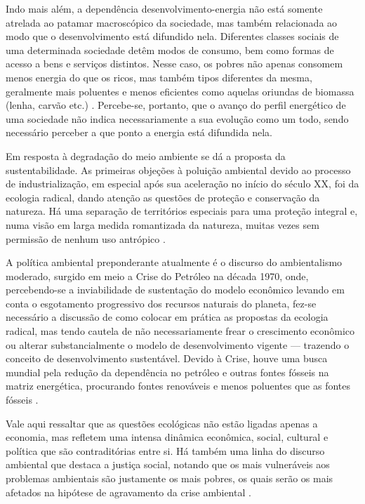 Indo mais além, a dependência desenvolvimento-energia não está somente atrelada
ao patamar macroscópico da sociedade, mas também relacionada ao modo que o
desenvolvimento está difundido nela. Diferentes classes sociais de uma
determinada sociedade detêm modos de consumo, bem como formas de acesso a bens e
serviços distintos. Nesse caso, os pobres não apenas consomem menos
energia do que os ricos, mas também tipos diferentes da mesma, geralmente mais
poluentes e menos eficientes como aquelas oriundas de biomassa (lenha, carvão
etc.) \cite{rippel}. Percebe-se, portanto, que o avanço do perfil energético de
uma sociedade não indica necessariamente a sua evolução como um todo, sendo
necessário perceber a que ponto a energia está difundida nela.

Em resposta à degradação do meio ambiente se dá a proposta da
sustentabilidade. As primeiras objeções à poluição ambiental devido ao processo 
de industrialização, em especial após sua aceleração no início do século XX,
foi da ecologia radical, dando atenção as questões de proteção e conservação da natureza.
Há uma separação de territórios especiais para uma proteção integral e, numa
visão em larga medida romantizada da natureza, muitas vezes sem permissão 
de nenhum uso antrópico \cite{jatoba}.

A política ambiental preponderante atualmente é o discurso do ambientalismo moderado, 
surgido em meio a Crise do Petróleo na década 1970, onde, percebendo-se a
inviabilidade de sustentação do modelo econômico levando em conta o esgotamento
progressivo dos recursos naturais do planeta, fez-se necessário a discussão de como 
colocar em prática as propostas da ecologia radical, mas tendo cautela de não 
necessariamente frear o crescimento econômico ou alterar substancialmente o 
modelo de desenvolvimento vigente --- trazendo o conceito de desenvolvimento
sustentável. Devido à Crise, houve uma busca mundial pela redução da 
dependência no petróleo e outras fontes fósseis na matriz energética, 
procurando fontes renováveis e menos poluentes que as fontes fósseis 
\cite{jatoba,epe_eficiencia_2012,rippel}. 

Vale aqui ressaltar que as questões ecológicas não estão ligadas apenas a
economia, mas refletem uma intensa dinâmica econômica, social, cultural e política 
que são contraditórias entre si. Há também uma linha do discurso ambiental que destaca a
justiça social, notando que os mais vulneráveis aos problemas
ambientais são justamente os mais pobres, os quais serão os mais afetados na
hipótese de agravamento da crise ambiental \cite{jatoba}.

